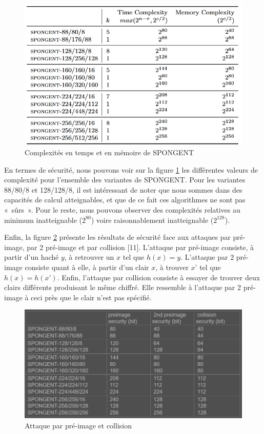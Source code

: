 		\begin{figure}[h]
			\centering
			\includegraphics[width=\textwidth]{imgs/Spongent/timeComplexity.png}
			\caption{Complexités en temps et en mémoire de SPONGENT}
			\label{timeComplexity}
		\end{figure}

		En termes de sécurité, nous pouvons voir sur la figure \ref{timeComplexity} les différentes valeurs de complexité pour l’ensemble des variantes de SPONGENT.
		Pour les variantes 88/80/8 et 128/128/8, il est intéressant de noter que nous sommes dans des capacités de calcul atteignables, et que de ce fait ces algorithmes ne sont pas « sûrs ».
		Pour le reste, nous pouvons observer des complexités relatives au minimum inatteignable ($2^{80}$) voire raisonnablement inatteignable ($2^{128}$).
		
		Enfin, la figure \ref{attaquePreImage} présente les résultats de sécurité face aux attaques par pré-image, par 2 pré-image et par collision [11].
		L’attaque par pré-image consiste, à partir d’un haché $y$, à retrouver un $x$ tel que $h(x) = y$.
		L’attaque par 2 pré-image consiste quant à elle, à partir d’un clair $x$, à trouver $x’$ tel que $h(x) = h(x’)$.
		Enfin, l’attaque par collision consiste à essayer de trouver deux clairs différents produisant le même chiffré.
		Elle ressemble à l’attaque par 2 pré-image à ceci près que le clair n’est pas spécifié.
		
		\begin{figure}[!h]
			\centering
			\includegraphics[width=\textwidth, height=0.3\textheight]{imgs/Spongent/attaquePreImage.png}
			\caption{Attaque par pré-image et collision}
			\label{attaquePreImage}
		\end{figure}

